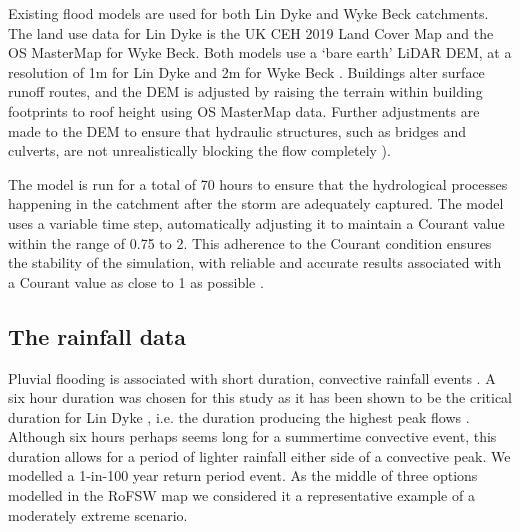 \documentclass[APA,Times2COL]{WileyNJDv5}
\begin{document}
Existing flood models are used for both Lin Dyke \citep{beadle2021} and Wyke Beck \citep{singh2023drainage} catchments. The land use data for Lin Dyke is the UK CEH 2019 Land Cover Map \citep{morton2020land} and the OS MasterMap for Wyke Beck. Both models use a `bare earth' LiDAR DEM, at a resolution of 1m for Lin Dyke and 2m for Wyke Beck \citep{envagency2021}. Buildings alter surface runoff routes, and the DEM is adjusted by raising the terrain within building footprints to roof height using OS MasterMap data. Further adjustments are made to the DEM to ensure that hydraulic structures, such as bridges and culverts, are not unrealistically blocking the flow completely \citep{beadle2021, singh2023drainage, houston2011pluvial, wang2018integrated}). 


The model is run for a total of 70 hours to ensure that the hydrological processes happening in the catchment after the storm are adequately captured. The model uses a variable time step, automatically adjusting it to maintain a Courant value within the range of 0.75 to 2. This adherence to the Courant condition ensures the stability of the simulation, with reliable and accurate results associated with a Courant value as close to 1 as possible \citep{rangari2019assessment}.



\subsection{The rainfall data}\label{sec:rainfalldata}

Pluvial flooding is associated with short duration, convective rainfall events \citep{rudd2020investigating}. A six hour duration was chosen for this study as it has been shown to be the critical duration for Lin Dyke \citep{beadle2021}, i.e. the duration producing the highest peak flows \citep{daviescritical}. Although six hours perhaps seems long for a summertime convective event, this duration allows for a period of lighter rainfall either side of a convective peak. We modelled a 1-in-100 year return period event. As the middle of three options modelled in the RoFSW map \citep{envagency2019} we considered it a representative example of a moderately extreme scenario. 
\end{document}

